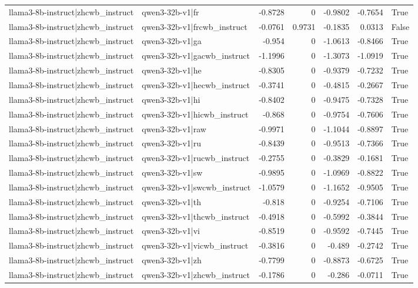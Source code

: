 \begin{table}
\begin{tabular}{l l r r r r l}
llama3-8b-instruct|zhcwb_instruct & qwen3-32b-v1|fr & -0.8728 & 0 & -0.9802 & -0.7654 & True \\
llama3-8b-instruct|zhcwb_instruct & qwen3-32b-v1|frcwb_instruct & -0.0761 & 0.9731 & -0.1835 & 0.0313 & False \\
llama3-8b-instruct|zhcwb_instruct & qwen3-32b-v1|ga & -0.954 & 0 & -1.0613 & -0.8466 & True \\
llama3-8b-instruct|zhcwb_instruct & qwen3-32b-v1|gacwb_instruct & -1.1996 & 0 & -1.3073 & -1.0919 & True \\
llama3-8b-instruct|zhcwb_instruct & qwen3-32b-v1|he & -0.8305 & 0 & -0.9379 & -0.7232 & True \\
llama3-8b-instruct|zhcwb_instruct & qwen3-32b-v1|hecwb_instruct & -0.3741 & 0 & -0.4815 & -0.2667 & True \\
llama3-8b-instruct|zhcwb_instruct & qwen3-32b-v1|hi & -0.8402 & 0 & -0.9475 & -0.7328 & True \\
llama3-8b-instruct|zhcwb_instruct & qwen3-32b-v1|hicwb_instruct & -0.868 & 0 & -0.9754 & -0.7606 & True \\
llama3-8b-instruct|zhcwb_instruct & qwen3-32b-v1|raw & -0.9971 & 0 & -1.1044 & -0.8897 & True \\
llama3-8b-instruct|zhcwb_instruct & qwen3-32b-v1|ru & -0.8439 & 0 & -0.9513 & -0.7366 & True \\
llama3-8b-instruct|zhcwb_instruct & qwen3-32b-v1|rucwb_instruct & -0.2755 & 0 & -0.3829 & -0.1681 & True \\
llama3-8b-instruct|zhcwb_instruct & qwen3-32b-v1|sw & -0.9895 & 0 & -1.0969 & -0.8822 & True \\
llama3-8b-instruct|zhcwb_instruct & qwen3-32b-v1|swcwb_instruct & -1.0579 & 0 & -1.1652 & -0.9505 & True \\
llama3-8b-instruct|zhcwb_instruct & qwen3-32b-v1|th & -0.818 & 0 & -0.9254 & -0.7106 & True \\
llama3-8b-instruct|zhcwb_instruct & qwen3-32b-v1|thcwb_instruct & -0.4918 & 0 & -0.5992 & -0.3844 & True \\
llama3-8b-instruct|zhcwb_instruct & qwen3-32b-v1|vi & -0.8519 & 0 & -0.9592 & -0.7445 & True \\
llama3-8b-instruct|zhcwb_instruct & qwen3-32b-v1|vicwb_instruct & -0.3816 & 0 & -0.489 & -0.2742 & True \\
llama3-8b-instruct|zhcwb_instruct & qwen3-32b-v1|zh & -0.7799 & 0 & -0.8873 & -0.6725 & True \\
llama3-8b-instruct|zhcwb_instruct & qwen3-32b-v1|zhcwb_instruct & -0.1786 & 0 & -0.286 & -0.0711 & True \\

\end{tabular}
\end{table}
